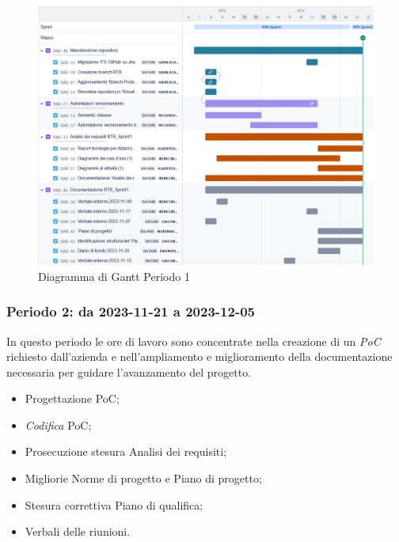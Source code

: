 \documentclass[10pt, a4paper]{article}
\begin{document}
 \begin{figure}[H]
        \centering        
        \includegraphics[width=15.5cm]{gantt/ganttPeriodo1.png}
        \caption{Diagramma di Gantt Periodo 1 }
    \end{figure}
\newpage
\subsubsection{Periodo 2: da 2023-11-21 a 2023-12-05}
In questo periodo le ore di lavoro sono concentrate nella creazione di un \textit{PoC\pg} richiesto dall'azienda e nell'ampliamento e miglioramento della documentazione necessaria per guidare l'avanzamento del progetto.
\begin{itemize}
    \item Progettazione PoC;
    \item \textit{Codifica\pg} PoC;
    \item Prosecuzione stesura Analisi dei requisiti;
    \item Migliorie Norme di progetto e Piano di progetto;
    \item Stesura correttiva Piano di qualifica;
    \item Verbali delle riunioni.
  
\end{itemize}
\vspace{1em}
\end{document}
